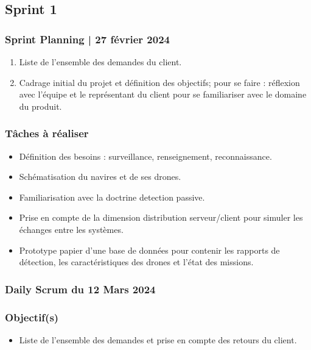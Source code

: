 

\subsection{Sprint 1}

		\subsubsection{Sprint Planning  | 27 février 2024}
		\begin{enumerate}
			\item Liste de l’ensemble des demandes du client.
			\item Cadrage initial du projet et définition des objectifs; pour se faire : réflexion avec l'équipe et le représentant du client pour se familiariser avec le domaine du produit.
		\end{enumerate}
		
		\subsubsection*{Tâches à réaliser}
		\begin{itemize}
			\item Définition des besoins : surveillance, renseignement, reconnaissance.
			\item Schématisation du navires et de ses drones.
			\item Familiarisation avec la doctrine detection passive.
			\item Prise en compte de la dimension distribution serveur/client pour simuler les échanges entre les systèmes.
			\item Prototype papier d’une base de données pour contenir les rapports de détection, les caractéristiques des drones et l’état des missions.
		\end{itemize}
		
		\subsubsection{Daily Scrum du 12 Mars 2024}
		\subsubsection*{Objectif(s)}
		\begin{itemize}
			\item Liste de l’ensemble des demandes et prise en compte des retours du client.
		\end{itemize}
		
